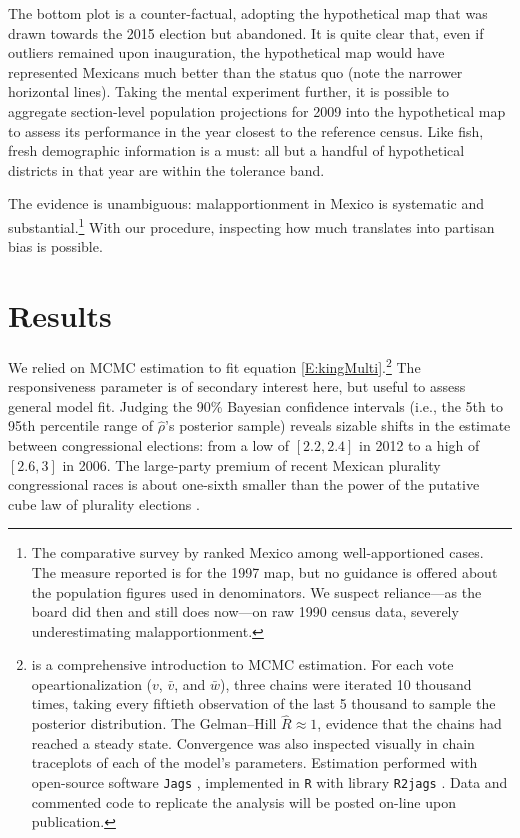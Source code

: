 \documentclass[letter,12pt]{article}
\begin{document}
The bottom plot is a counter-factual, adopting the hypothetical map that was drawn towards the 2015 election but abandoned. It is quite clear that, even if outliers remained upon inauguration, the hypothetical map would have represented Mexicans much better than the status quo (note the narrower horizontal lines). Taking the mental experiment further, it is possible to aggregate section-level population projections for 2009 into the hypothetical map to assess its performance in the year closest to the reference census. Like fish, fresh demographic information is a must: all but a handful of hypothetical districts in that year are within the tolerance band. 

The evidence is unambiguous: malapportionment in Mexico is systematic and substantial.\footnote{The comparative survey by \citet{snyder.samuelsMalapp2004} ranked Mexico among well-apportioned cases. The measure reported is for the 1997 map, but no guidance is offered about the population figures used in denominators. We suspect reliance---as the board did then and still does now---on raw 1990 census data, severely underestimating malapportionment.} With our procedure, inspecting how much translates into partisan bias is possible. 







\section{Results}

We relied on MCMC estimation to fit equation \ref{E:kingMulti}.\footnote{\citet{gelman.hill.2007} is a comprehensive introduction to MCMC estimation. For each vote opeartionalization ($v$, $\bar{v}$, and $\bar{w}$), three chains were iterated 10 thousand times, taking every fiftieth observation of the last 5 thousand to sample the posterior distribution. The Gelman--Hill $\hat{R} \approx 1$, evidence that the chains had reached a steady state. Convergence was also inspected visually in chain traceplots of each of the model's parameters. Estimation performed with open-source software \texttt{Jags} \citep{jags.cite}, implemented in \texttt{R} \citep{r.cite} with library \texttt{R2jags} \citep{r.r2jags}. Data and commented code to replicate the analysis will be posted on-line upon publication.} The responsiveness parameter is of secondary interest here, but useful to assess general model fit. Judging the 90\% Bayesian confidence intervals (i.e., the 5th to 95th percentile range of $\hat{\rho}$'s posterior sample) reveals sizable shifts in the estimate between congressional elections: from a low of $[2.2,2.4]$ in 2012 to a high of $[2.6,3]$ in 2006. The large-party premium of recent Mexican plurality congressional races is about one-sixth smaller than the power of the putative cube law of plurality elections \citep{taagepera.CubeLaw.1973}. 
\end{document}
